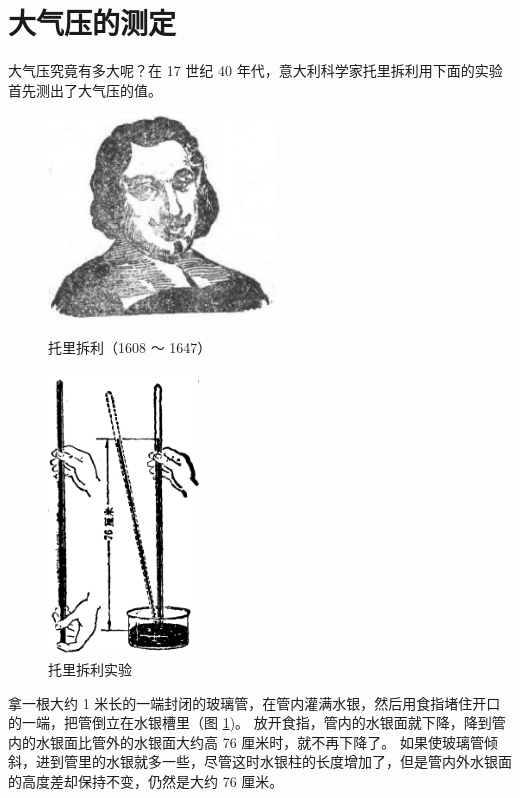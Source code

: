 \section{大气压的测定}\label{sec:5-11}

大气压究竟有多大呢？在 17 世纪 40 年代，意大利科学家托里拆利用下面的实验首先测出了大气压的值。

\begin{figure}[htbp]
    \centering
    \begin{minipage}{9cm}
    \centering
    \vspace{5.5em}
    \includegraphics[width=6cm]{../pic/czwl1-ch5-torricelli}
    \caption*{托里拆利（1608 ～ 1647）}\label{fig:5-torricelli}
    \end{minipage}
    \qquad
    \begin{minipage}{5cm}
    \centering
    \includegraphics[width=4cm]{../pic/czwl1-ch5-41}
    \caption{托里拆利实验}\label{fig:5-41}
    \end{minipage}
\end{figure}


拿一根大约 1 米长的一端封闭的玻璃管，在管内灌满水银，然后用食指堵住开口的一端，把管倒立在水银槽里（图 \ref{fig:5-41})。
放开食指，管内的水银面就下降，降到管内的水银面比管外的水银面大约高 76 厘米时，就不再下降了。
如果使玻璃管倾斜，进到管里的水银就多一些，尽管这时水银柱的长度增加了，但是管内外水银面的高度差却保持不变，仍然是大约 76 厘米。


